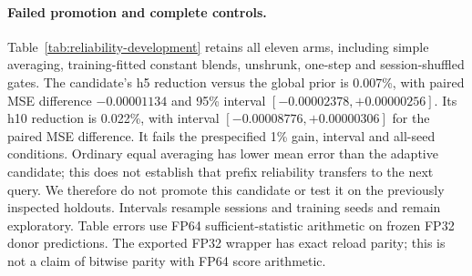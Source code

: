 \paragraph{Failed promotion and complete controls.}
Table~\ref{tab:reliability-development} retains all eleven arms, including
simple averaging, training-fitted constant blends, unshrunk, one-step and
session-shuffled gates. The candidate's h5 reduction versus the global prior
is 0.007\%, with paired MSE difference $-0.00001134$ and 95\% interval
$[-0.00002378,+0.00000256]$. Its h10 reduction is 0.022\%, with interval
$[-0.00008776,+0.00000306]$ for the paired MSE difference.
It fails the prespecified 1\% gain, interval and all-seed conditions.
Ordinary equal averaging has lower mean error than the adaptive candidate;
this does not establish that prefix reliability transfers to the next query.
We therefore do not promote this candidate or test it on the previously
inspected holdouts. Intervals resample sessions and training seeds and remain
exploratory. Table errors use FP64 sufficient-statistic arithmetic on frozen
FP32 donor predictions. The exported FP32 wrapper has exact reload parity;
this is not a claim of bitwise parity with FP64 score arithmetic.


